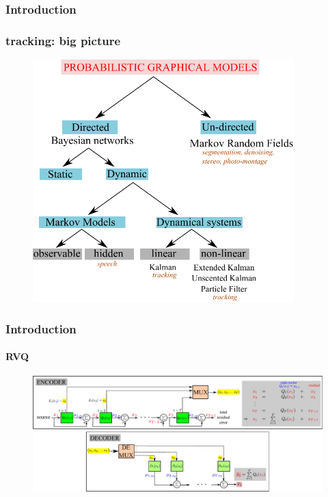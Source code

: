 \begin{frame}
\frametitle{Introduction}
\frametitle{tracking: big picture}
\logoCSIPCPL\mypagenum
	\begin{figure}
		\includegraphics[width=0.9\textwidth]{figs/PRML_PGM_overview.pdf}
	\end{figure}
\end{frame}


\begin{frame}[plain]
\frametitle{Introduction}
\framesubtitle{RVQ}
\logoCSIPCPL\mypagenum
	\begin{changemargin}{-1.3in}{0in}
		\begin{figure}				
			\includegraphics[width=1.3\textwidth]{figs/RVQ_blockDiagram.pdf}
			\label{fig:RVQ_SQ_DMSE}
		\end{figure}
	\end{changemargin}
\end{frame}


